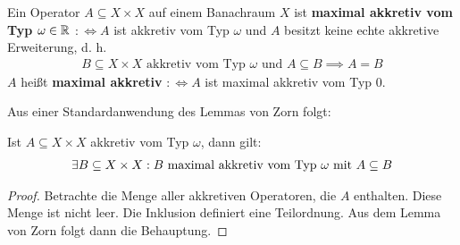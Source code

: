 \begin{definition}
	Ein Operator $A\subseteq X\times X$ auf einem Banachraum $X$ ist \textbf{maximal akkretiv vom Typ $\omega\in\R$} 
	$:\Longleftrightarrow A$ ist akkretiv vom Typ $\omega$ und $A$ besitzt keine echte akkretive Erweiterung, d. h.
	\begin{align*}
		B\subseteq X\times X\text{ akkretiv vom Typ $\omega$ und }A\subseteq B
		\implies A=B
	\end{align*}
	$A$ heißt \textbf{maximal akkretiv} $:\Longleftrightarrow A$ ist maximal akkretiv vom Typ 0.
\end{definition}

Aus einer Standardanwendung des Lemmas von Zorn folgt:

\begin{lemma}
	Ist $A\subseteq X\times X$ akkretiv vom Typ $\omega$, dann gilt:
	\begin{align*}
		\exists B\subseteq X\times X: B\text{ maximal akkretiv vom Typ }\omega\mit A\subseteq B
	\end{align*}
\end{lemma}

\begin{proof}
	Betrachte die Menge aller akkretiven Operatoren, die $A$ enthalten. 
	Diese Menge ist nicht leer. 
	Die Inklusion definiert eine Teilordnung. 
	Aus dem Lemma von Zorn folgt dann die Behauptung.
\end{proof}

